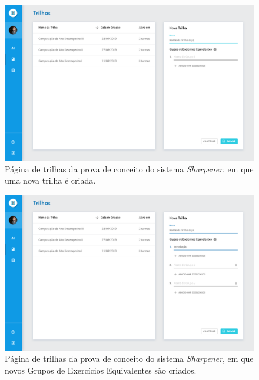   \begin{figure}[htpb]
  \centering
  \includegraphics[width=\linewidth]{images/mocks/trackAdd1.png}
  \caption{Página de trilhas da prova de conceito do sistema \emph{Sharpener}, 
  em que uma nova trilha é criada.}%
  \label{fig:add_track1}
  \end{figure}
  
    \begin{figure}[htpb]
  \centering
  \includegraphics[width=\linewidth]{images/mocks/trackAdd2.png}
  \caption{Página de trilhas da prova de conceito do sistema \emph{Sharpener}, 
  em que novos Grupos de Exercícios Equivalentes são criados.}%
  \label{fig:add_track2}
  \end{figure}

